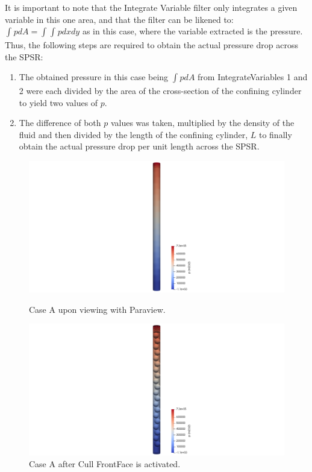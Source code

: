 It is important to note that the Integrate Variable filter only integrates a given variable in this one area, and that the filter can be likened to: $\int_{}^{}pdA = \int_{}^{}\int_{}^{}pdxdy$ as in this case, where the variable extracted is the pressure. Thus, the following steps are required to obtain the actual pressure drop across the SPSR:
\begin{enumerate}
	\item The obtained pressure in this case being $\int_{}^{}pdA$ from IntegrateVariables 1 and 2 were each divided by the area of the cross-section of the confining cylinder to yield two values of $p$.
	\item The difference of both $p$ values was taken, multiplied by the density of the fluid and then divided by the length of the confining cylinder, $L$ to finally obtain the actual pressure drop per unit length across the SPSR.
\end{enumerate}
\begin{figure} [H]
	\includegraphics[width=\linewidth]{Figures/visualisation/caseA/noCullFace_CaseA.png}
	\caption{Case A upon viewing with Paraview.}
	\label{fig:noCullFrontFace_Default_CaseA} 
	
	\includegraphics[width=\linewidth]{Figures/visualisation/caseA/CullFace_CaseA.png}
	\caption{Case A after Cull FrontFace is activated.}
	\label{fig:CullFrontFace_Default_CaseA}
\end{figure}
